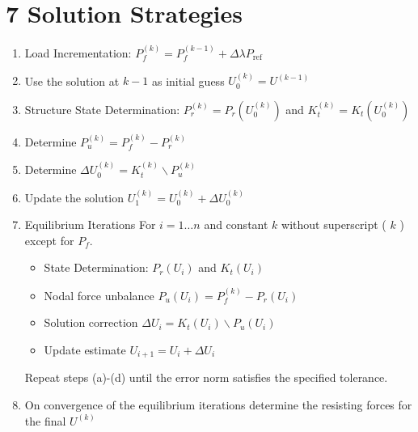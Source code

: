 \hypertarget{solution-strategies}{%
\section{7 Solution Strategies}\label{solution-strategies}}

\begin{enumerate}
\def\labelenumi{\arabic{enumi}.}
\item
  Load Incrementation:
  \(P_{f}^{(k)}=P_{f}^{(k-1)}+\Delta \lambda P_{\text {ref }}\)
\item
  Use the solution at \(k-1\) as initial guess \(U_{0}^{(k)}=U^{(k-1)}\)
\item
  Structure State Determination:
  \(P_{r}^{(k)}=P_{r}\left(U_{0}^{(k)}\right)\) and
  \(K_{t}^{(k)}=K_{t}\left(U_{0}^{(k)}\right)\)
\item
  Determine \(P_{u}^{(k)}=P_{f}^{(k)}-P_{r}^{(k)}\)
\item
  Determine \(\Delta U_{0}^{(k)}=K_{t}^{(k)} \backslash P_{u}^{(k)}\)
\item
  Update the solution \(U_{1}^{(k)}=U_{0}^{(k)}+\Delta U_{0}^{(k)}\)
\item
  Equilibrium Iterations For \(i=1 \ldots n\) and constant \(k\) without
  superscript ( \(k\) ) except for \(P_{f}\).

  \begin{itemize}
  \tightlist
  \item
    State Determination: \(P_{r}\left(U_{i}\right)\) and
    \(K_{t}\left(U_{i}\right)\)
  \item
    Nodal force unbalance
    \(P_{u}\left(U_{i}\right)=P_{f}^{(k)}-P_{r}\left(U_{i}\right)\)
  \item
    Solution correction
    \(\Delta U_{i}=K_{t}\left(U_{i}\right) \backslash P_{u}\left(U_{i}\right)\)
  \item
    Update estimate \(U_{i+1}=U_{i}+\Delta U_{i}\)
  \end{itemize}

  Repeat steps (a)-(d) until the error norm satisfies the specified
  tolerance.
\item
  On convergence of the equilibrium iterations determine the resisting
  forces for the final \(U^{(k)}\)
\end{enumerate}
